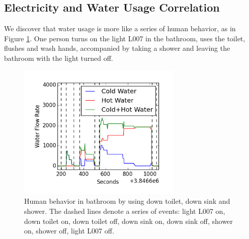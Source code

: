 \subsection{Electricity and Water Usage Correlation}

We discover that water usage is more like a series of human behavior, as in Figure \ref{fig_bathroomBehavior}.
One person turns on the light L007 in the bathroom,  uses the toilet, flushes and wash hands,
accompanied by  taking  a shower and leaving the bathroom with the light turned off. 
\begin{figure}[!t]
\centering
\includegraphics[width=0.7\textwidth]{multidisaggfig/bathroomBehavior.png}
\caption{Human behavior in bathroom by using down toilet, down sink and shower. The dashed lines denote 
a series of events: light L007 on, down toilet on,  down toilet off, down sink on, down sink off, shower on, shower off, light L007 off. }
\label{fig_bathroomBehavior}
\end{figure}

